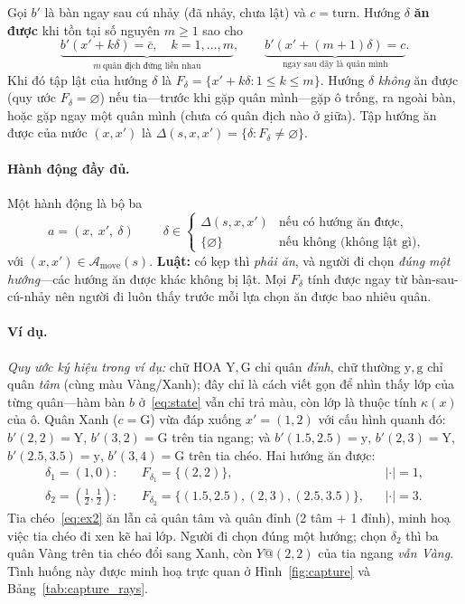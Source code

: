 Gọi $b'$ là bàn ngay sau cú nhảy (đã nhảy, chưa lật) và $c=\mathrm{turn}$.
Hướng $\delta$ \textbf{ăn được} khi tồn tại số nguyên $m\ge 1$ sao cho
\begin{equation}
\underbrace{b'(x'+k\delta)=\bar c,\quad k=1,\dots,m}_{m\ \text{quân địch đứng liền nhau}},
\qquad
\underbrace{b'(x'+(m{+}1)\delta)=c}_{\text{ngay sau dãy là quân mình}}.
\label{eq:clamp}
\end{equation}
Khi đó tập lật của hướng $\delta$ là $F_\delta=\{x'+k\delta : 1\le k\le m\}$.
Hướng $\delta$ \emph{không} ăn được (quy ước $F_\delta=\varnothing$) nếu
tia---trước khi gặp quân mình---gặp ô trống, ra ngoài bàn, hoặc gặp ngay
một quân mình (chưa có quân địch nào ở giữa). Tập hướng ăn được của nước
$(x,x')$ là $\Delta(s,x,x')=\{\delta : F_\delta\neq\varnothing\}$.

\paragraph{Hành động đầy đủ.} Một hành động là bộ ba
\begin{equation}
\boxed{\;a=(x,\ x',\ \delta)\;}
\qquad
\delta\in
\begin{cases}
\Delta(s,x,x') & \text{nếu có hướng ăn được},\\
\{\varnothing\} & \text{nếu không (không lật gì)},
\end{cases}
\label{eq:action}
\end{equation}
với $(x,x')\in\mathcal A_{\mathrm{move}}(s)$. \textbf{Luật:} có kẹp thì
\emph{phải ăn}, và người đi chọn \emph{đúng một hướng}---các hướng ăn
được khác không bị lật. Mọi $F_\delta$ tính được ngay từ bàn-sau-cú-nhảy
nên người đi luôn thấy trước mỗi lựa chọn ăn được bao nhiêu quân.
\paragraph{Ví dụ.} \emph{Quy ước ký hiệu trong ví dụ:} chữ HOA
$\mathrm Y,\mathrm G$ chỉ quân \emph{đỉnh}, chữ thường $\mathrm y,\mathrm g$
chỉ quân \emph{tâm} (cùng màu Vàng/Xanh); đây chỉ là cách viết gọn để nhìn
thấy lớp của từng quân---hàm bàn $b$ ở~\eqref{eq:state} vẫn chỉ trả màu, còn
lớp là thuộc tính $\kappa(x)$ của ô. Quân Xanh ($c=\mathrm G$) vừa đáp xuống
$x'=(1,2)$ với cấu hình quanh đó: $b'(2,2)=\mathrm Y$, $b'(3,2)=\mathrm G$ trên tia
ngang; và $b'(1.5,2.5)=\mathrm y$, $b'(2,3)=\mathrm Y$,
$b'(2.5,3.5)=\mathrm y$, $b'(3,4)=\mathrm G$ trên tia chéo. Hai hướng ăn
được:
\begin{align}
\delta_1=(1,0):\quad & F_{\delta_1}=\{(2,2)\}, && |{\cdot}|=1, \label{eq:ex1}\\
\delta_2=(\tfrac12,\tfrac12):\quad & F_{\delta_2}=\{(1.5,2.5),(2,3),(2.5,3.5)\}, && |{\cdot}|=3. \label{eq:ex2}
\end{align}
Tia chéo~\eqref{eq:ex2} ăn lẫn cả quân tâm và quân đỉnh (2 tâm $+$ 1
đỉnh), minh hoạ việc tia chéo đi xen kẽ hai lớp. Người đi chọn đúng một
hướng; chọn $\delta_2$ thì ba quân Vàng trên tia chéo đổi sang Xanh, còn
$Y@(2,2)$ của tia ngang \emph{vẫn Vàng}. Tình huống này được minh hoạ
trực quan ở Hình~\ref{fig:capture} và Bảng~\ref{tab:capture_rays}.

